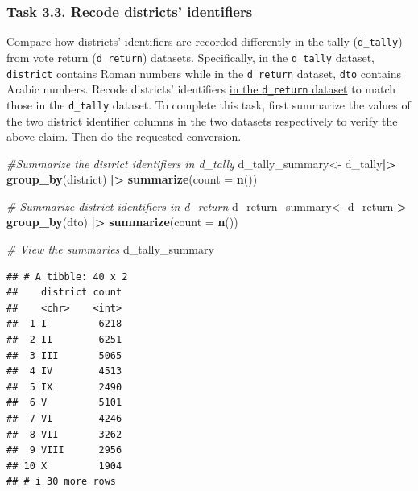 \documentclass[
]{article}
\newenvironment{Shaded}{\begin{snugshade}}{\end{snugshade}}
\newcommand{\AttributeTok}[1]{\textcolor[rgb]{0.13,0.29,0.53}{#1}}
\newcommand{\CommentTok}[1]{\textcolor[rgb]{0.56,0.35,0.01}{\textit{#1}}}
\newcommand{\FunctionTok}[1]{\textcolor[rgb]{0.13,0.29,0.53}{\textbf{#1}}}
\newcommand{\NormalTok}[1]{#1}
\newcommand{\OtherTok}[1]{\textcolor[rgb]{0.56,0.35,0.01}{#1}}
\newcommand{\SpecialCharTok}[1]{\textcolor[rgb]{0.81,0.36,0.00}{\textbf{#1}}}
\begin{document}
\clearpage

\hypertarget{task-3.3.-recode-districts-identifiers}{%
\subsubsection{Task 3.3. Recode districts'
identifiers}\label{task-3.3.-recode-districts-identifiers}}

Compare how districts' identifiers are recorded differently in the tally
(\texttt{d\_tally}) from vote return (\texttt{d\_return}) datasets.
Specifically, in the \texttt{d\_tally} dataset, \texttt{district}
contains Roman numbers while in the \texttt{d\_return} dataset,
\texttt{dto} contains Arabic numbers. Recode districts' identifiers
\ul{in the \texttt{d\_return} dataset} to match those in the
\texttt{d\_tally} dataset. To complete this task, first summarize the
values of the two district identifier columns in the two datasets
respectively to verify the above claim. Then do the requested
conversion.

\begin{Shaded}
\begin{Highlighting}[]
\CommentTok{\#Summarize the district identifiers in d\_tally}
\NormalTok{d\_tally\_summary}\OtherTok{\textless{}{-}}\NormalTok{ d\_tally}\SpecialCharTok{|\textgreater{}}
  \FunctionTok{group\_by}\NormalTok{(district) }\SpecialCharTok{|\textgreater{}}
  \FunctionTok{summarize}\NormalTok{(}\AttributeTok{count =} \FunctionTok{n}\NormalTok{())}

\CommentTok{\# Summarize district identifiers in d\_return}
\NormalTok{d\_return\_summary}\OtherTok{\textless{}{-}}\NormalTok{ d\_return}\SpecialCharTok{|\textgreater{}}
  \FunctionTok{group\_by}\NormalTok{(dto) }\SpecialCharTok{|\textgreater{}}
  \FunctionTok{summarize}\NormalTok{(}\AttributeTok{count =} \FunctionTok{n}\NormalTok{())}

\CommentTok{\# View the summaries}
\NormalTok{d\_tally\_summary}
\end{Highlighting}
\end{Shaded}

\begin{verbatim}
## # A tibble: 40 x 2
##    district count
##    <chr>    <int>
##  1 I         6218
##  2 II        6251
##  3 III       5065
##  4 IV        4513
##  5 IX        2490
##  6 V         5101
##  7 VI        4246
##  8 VII       3262
##  9 VIII      2956
## 10 X         1904
## # i 30 more rows
\end{verbatim}
\end{document}

